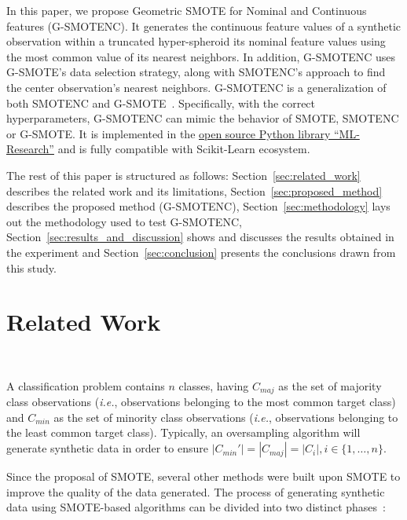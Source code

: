 \documentclass[parskip=full]{scrartcl}
\begin{document}
In this paper, we propose Geometric SMOTE for Nominal and Continuous features
(G-SMOTENC). It generates the continuous feature values of a synthetic
observation within a truncated hyper-spheroid its nominal feature values using
the most common value of its nearest neighbors. In addition, G-SMOTENC uses
G-SMOTE's data selection strategy, along with SMOTENC's approach to find the
center observation's nearest neighbors. G-SMOTENC is a generalization of both
SMOTENC and G-SMOTE~\cite{douzas2019geometric}. Specifically, with the correct
hyperparameters, G-SMOTENC can mimic the behavior of SMOTE, SMOTENC or
G-SMOTE\@. It is implemented in the
\href{https://github.com/joaopfonseca/ml-research}{open source Python
library ``ML-Research''} and is fully compatible with Scikit-Learn ecosystem.

The rest of this paper is structured as follows:
Section~\ref{sec:related_work} describes the related work and its limitations,
Section~\ref{sec:proposed_method} describes the proposed
method (G-SMOTENC), Section~\ref{sec:methodology} lays out the methodology
used to test G-SMOTENC, Section~\ref{sec:results_and_discussion} shows and
discusses the results obtained in the experiment and
Section~\ref{sec:conclusion} presents the conclusions drawn from this study.


\section{Related Work}~\label{sec:related_work}

A classification problem contains $n$ classes, having $C_{maj}$ as the set of
majority class observations (\textit{i.e.}, observations belonging to the most
common target class) and $C_{min}$ as the set of minority class observations
(\textit{i.e.}, observations belonging to the least common target class).
Typically, an oversampling algorithm will generate synthetic data in order to
ensure $|C_{min}'|=|C_{maj}|=|C_i|, i \in \{1, \ldots, n\}$.

Since the proposal of SMOTE, several other methods were built upon SMOTE to
improve the quality of the data generated. The process of generating synthetic
data using SMOTE-based algorithms can be divided into two distinct
phases~\cite{fernandez2018smote}:
\end{document}
